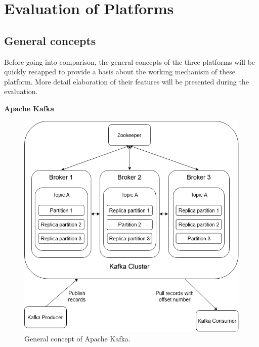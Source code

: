 \chapter{Evaluation of Platforms} \label{chap:evaluation}
\section{General concepts}
Before going into comparison, the general concepts of the three platforms will be quickly recapped to provide a basis about the working mechanism of these platform. More detail elaboration of their features will be presented during the evaluation.

\textbf{Apache Kafka}

\begin{figure}[h]
	\centering
	\includegraphics[width=12cm]{images/general-kafka.png}
	\caption{General concept of Apache Kafka.}
	\label{fig:kafkageneral}
\end{figure}



